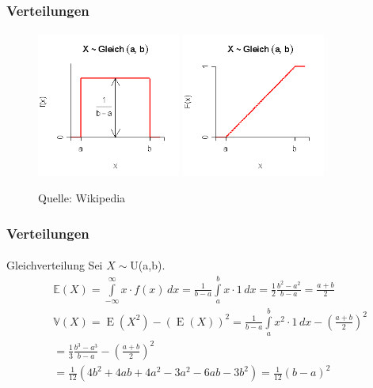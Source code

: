 \documentclass{beamer}
\begin{document}
\begin{frame}
    \frametitle{Verteilungen}
\framesubtitle{}

\begin{figure}[htp]
      \centering
    \includegraphics[width=0.42\textwidth]{img/gleichverteilung1}
    \includegraphics[width=0.42\textwidth]{img/gleichverteilung2}
      \caption{Quelle: Wikipedia}
\end{figure}
 \end{frame}




\begin{frame}
    \frametitle{Verteilungen}
\framesubtitle{}

\begin{block}{Gleichverteilung}
Sei $X \sim $U(a,b).
\begin{align*}
& \mathbb{E}(X) =\int\limits_{-\infty}^\infty x \cdot f(x)\,dx = \frac 1{b-a}\int\limits_a^b x\cdot 1\,dx = \frac 12\frac{b^2-a^2}{b-a} = \frac{a+b}2 \\
& \mathbb{V}(X) = \operatorname{E}(X^2) - \left({\operatorname{E}(X)} \right)^2  = \frac{1}{b - a}\int\limits_a^b {x^2 \cdot 1\,dx}  - \left( {\frac{a + b}{2}} \right)^2  \\
 & = \frac{1}{3}\frac{b^3  - a^3}{b - a} - \left( {\frac{a + b}{2}} \right)^2 \\
    &= \frac{1}{12}\left( {4b^2  + 4ab + 4a^2  - 3a^2  - 6ab - 3b^2 } \right) = \frac{1}{12}(b - a)^2
\end{align*}
\end{block}
 \end{frame}
\end{document}
